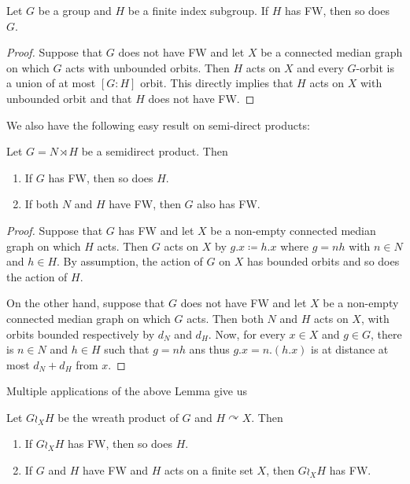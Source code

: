 \begin{lem}\label{Lemma:Subgroup}
Let $G$ be a group and $H$ be a finite index subgroup.
If $H$ has FW, then so does~$G$.
\end{lem}
\begin{proof}
Suppose that $G$ does not have FW and let $X$ be a connected median graph on which $G$ acts with unbounded orbits.
Then $H$ acts on $X$ and every $G$-orbit is a union of at most $[G:H]$ orbit. This directly implies that $H$ acts on $X$ with unbounded orbit and that $H$ does not have FW.
\end{proof}

We also have the following easy result on semi-direct products:
\begin{lem}\label{Lemma:Semidirect}
Let $G=N\rtimes H$ be a semidirect product. Then
\begin{enumerate}
\item
If $G$ has FW, then so does $H$.
\item
If both $N$ and $H$ have FW, then $G$ also has FW.
\end{enumerate}
\end{lem}
\begin{proof}
Suppose that $G$ has FW and let $X$ be a non-empty connected median graph on which $H$ acts.
Then $G$ acts on $X$ by $g.x\coloneqq h.x$ where $g=nh$ with $n\in N$ and $h\in H$.
By assumption, the action of $G$ on $X$ has bounded orbits and so does the action of $H$.

On the other hand, suppose that $G$ does not have FW and let $X$ be a non-empty connected median graph on which $G$ acts.
Then both $N$ and $H$ acts on $X$, with orbits bounded respectively by $d_N$ and $d_H$.
Now, for every $x\in X$ and $g\in G$, there is $n\in N$ and $h\in H$ such that $g=nh$ ans thus $g.x=n.(h.x)$ is at distance at most $d_N+d_H$ from $x$.
\end{proof}
Multiple applications of the above Lemma give us
\begin{cor}\label{Cor:Wreath}
Let $G\wr_X H$ be the wreath product of $G$ and $H\curvearrowright X$.
Then
\begin{enumerate}
\item
If $G\wr_X H$ has FW, then so does $H$.
\item
If $G$ and $H$ have FW and $H$ acts on a finite set $X$, then $G\wr_X H$ has FW.
\end{enumerate}
\end{cor}



